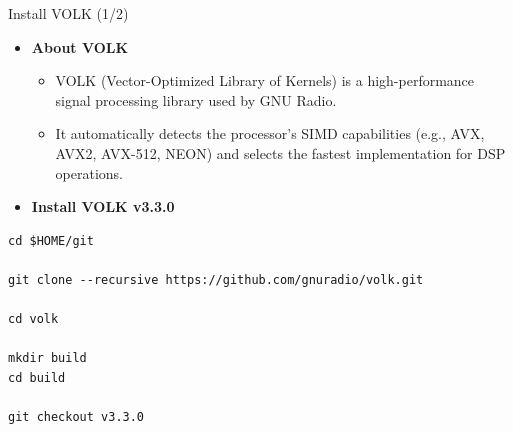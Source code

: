 \begin{frame}[fragile]{Install VOLK (1/2)}

\footnotesize
\vspace{-0.5cm}
\begin{itemize}
    \item \textbf{About VOLK}

    \begin{itemize}
        \item VOLK (Vector-Optimized Library of Kernels) is a high-performance
        signal processing library used by GNU Radio.
        \item It automatically detects the processor's SIMD capabilities
        (e.g., AVX, AVX2, AVX-512, NEON) and selects the fastest implementation
        for DSP operations.
    \end{itemize}
\vspace{0.3cm}
    \item \textbf{Install VOLK v3.3.0}
\end{itemize}

\scriptsize

\begin{Verbatim}[xleftmargin=2.8em,breaklines,breaksymbolleft={},breaksymbolright={}]
cd $HOME/git

git clone --recursive https://github.com/gnuradio/volk.git

cd volk

mkdir build
cd build

git checkout v3.3.0
\end{Verbatim}

\end{frame}